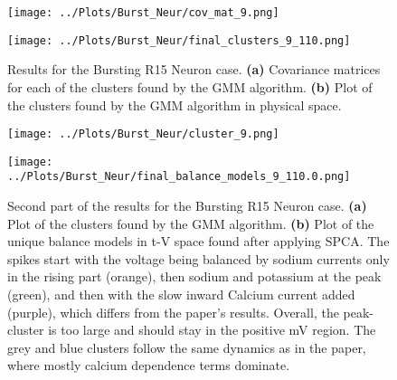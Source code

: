 \documentclass[12pt]{report} %
\begin{document}
\begin{figure}[htbp]
  \centering
  \begin{minipage}{0.9\textwidth}
    \centering
    \texttt{[image: ../Plots/Burst\_Neur/cov\_mat\_9.png]}
    \subcaption{}
  \end{minipage}

  \begin{minipage}{0.8\textwidth}
    \centering
    \texttt{[image: ../Plots/Burst\_Neur/final\_clusters\_9\_110.png]}
    \subcaption{}
  \end{minipage}

  \caption{Results for the Bursting R15 Neuron case. \textbf{(a)} Covariance matrices for each of the clusters found by the GMM algorithm. \textbf{(b)} Plot of the clusters found by the GMM algorithm in physical space. }
  \label{fig:burst_neur_results_1}
\end{figure}

\begin{figure}[htbp]
  \centering
  \begin{minipage}[b]{0.8\textwidth}
      \centering
      \texttt{[image: ../Plots/Burst\_Neur/cluster\_9.png]}
      \subcaption{}
  \end{minipage}

  \begin{minipage}[b]{0.6\textwidth}
      \centering
      \texttt{[image: ../Plots/Burst\_Neur/final\_balance\_models\_9\_110.0.png]}
      \subcaption{}
  \end{minipage}

  \caption{Second part of the results for the Bursting R15 Neuron case. \textbf{(a)} Plot of the clusters found by the GMM algorithm. \textbf{(b)} Plot of the unique balance models in t-V space found after applying SPCA. The spikes start with the voltage being balanced by sodium currents only in the rising part (orange), then sodium and potassium at the peak (green), and then with the slow inward Calcium current added (purple), which differs from the paper's results. Overall, the peak-cluster is too large and should stay in the positive mV region. The grey and blue clusters follow the same dynamics as in the paper, where mostly calcium dependence terms dominate.}
  \label{fig:burst_neur_results_2}
\end{figure}
\end{document}
